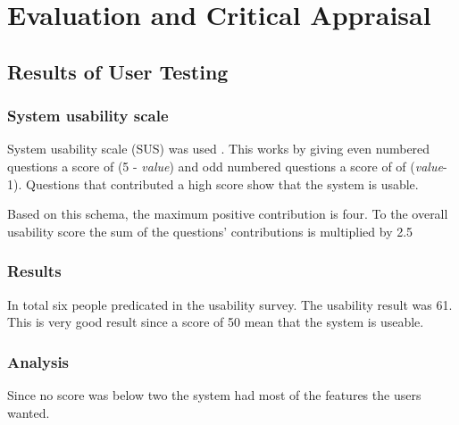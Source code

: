 \section{Evaluation and Critical Appraisal}

\subsection{Results of User Testing}

\subsubsection{System usability scale}
System usability scale (SUS) was used \cite{SUS}. This works by giving even numbered questions a score of (5 - \emph{value}) and odd numbered questions a score of of (\emph{value}-1). Questions that contributed a high score show that the system is usable. 

Based on this schema, the maximum positive contribution is four. To the overall usability score the sum of the questions' contributions is multiplied by 2.5 

\subsubsection{Results}
In total six people predicated in the usability survey. The usability result was 61. This is very good result since a score of 50 mean that the system is useable. 

\subsubsection{Analysis}
Since no score was below two the system had most of the features the users wanted.